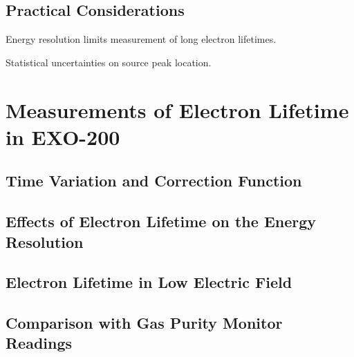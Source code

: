 \documentclass[herrin-thesis.tex]{subfiles}
\begin{document}
\subsection{Practical Considerations}

Energy resolution limits measurement of long electron lifetimes.

Statistical uncertainties on source peak location.

\section{Measurements of Electron Lifetime in EXO-200}

\subsection{Time Variation and Correction Function}

\subsection{Effects of Electron Lifetime on the Energy Resolution}

\subsection{Electron Lifetime in Low Electric Field}

\subsection{Comparison with Gas Purity Monitor Readings}
\end{document}
